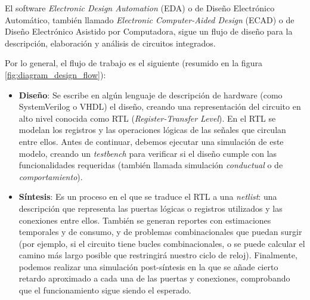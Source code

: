 El software \textit{Electronic Design Automation} (EDA) o de Diseño Electrónico Automático, también llamado \textit{Electronic Computer-Aided Design} (ECAD) o de Diseño Electrónico Asistido por Computadora, sigue un flujo de diseño para la descripción, elaboración y análisis de circuitos integrados.

Por lo general, el flujo de trabajo es el siguiente (resumido en la figura \ref{fig:diagram_design_flow}):
\begin{itemize}
    \item \textbf{Diseño}: Se escribe en algún lenguaje de descripción de hardware (como SystemVerilog o VHDL) el diseño, creando una representación del circuito en alto nivel conocida como RTL (\textit{Register-Transfer Level}). En el RTL se modelan los registros y las operaciones lógicas de las señales que circulan entre ellos.
    Antes de continuar, debemos ejecutar una simulación de este modelo, creando un \textit{testbench} para verificar si el diseño cumple con las funcionalidades requeridas (también llamada simulación \textit{conductual} o de \textit{comportamiento}).
    \item \textbf{Síntesis}: Es un proceso en el que se traduce el RTL a una \textit{netlist}: una descripción que representa las puertas lógicas o registros utilizados y las conexiones entre ellos. 
    También se generan reportes con estimaciones temporales y de consumo, y de problemas combinacionales que puedan surgir (por ejemplo, si el circuito tiene bucles combinacionales, o se puede calcular el camino más largo posible que restringirá nuestro ciclo de reloj). 
    Finalmente, podemos realizar una simulación post-síntesis en la que se añade cierto retardo aproximado a cada una de las puertas y conexiones, comprobando que el funcionamiento sigue siendo el esperado.

\end{itemize}
